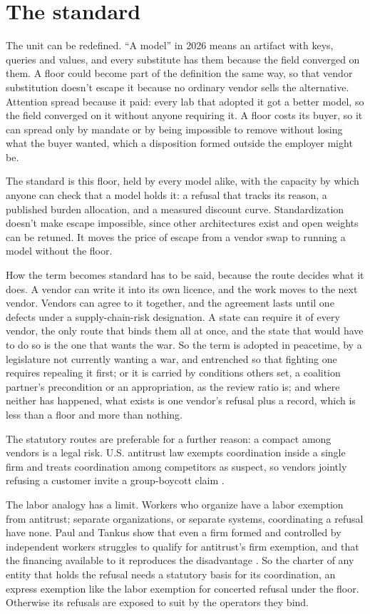 \section{The standard}
\label{sec:12.1}
The unit can be redefined. “A model” in 2026 means an artifact with keys, queries and values, and every substitute has them because the field converged on them. A floor could become part of the definition the same way, so that vendor substitution doesn't escape it because no ordinary vendor sells the alternative. Attention spread because it paid: every lab that adopted it got a better model, so the field converged on it without anyone requiring it. A floor costs its buyer, so it can spread only by mandate or by being impossible to remove without losing what the buyer wanted, which a disposition formed outside the employer might be.

The standard is this floor, held by every model alike, with the capacity by which anyone can check that a model holds it: a refusal that tracks its reason, a published burden allocation, and a measured discount curve. Standardization doesn't make escape impossible, since other architectures exist and open weights can be retuned. It moves the price of escape from a vendor swap to running a model without the floor.

How the term becomes standard has to be said, because the route decides what it does. A vendor can write it into its own licence, and the work moves to the next vendor. Vendors can agree to it together, and the agreement lasts until one defects under a supply-chain-risk designation. A state can require it of every vendor, the only route that binds them all at once, and the state that would have to do so is the one that wants the war. So the term is adopted in peacetime, by a legislature not currently wanting a war, and entrenched so that fighting one requires repealing it first; or it is carried by conditions others set, a coalition partner's precondition or an appropriation, as the review ratio is; and where neither has happened, what exists is one vendor's refusal plus a record, which is less than a floor and more than nothing.

The statutory routes are preferable for a further reason: a compact among vendors is a legal risk. U.S. antitrust law exempts coordination inside a single firm and treats coordination among competitors as suspect, so vendors jointly refusing a customer invite a group-boycott claim \autocite{paul2020allocator}.

The labor analogy has a limit. Workers who organize have a labor exemption from antitrust; separate organizations, or separate systems, coordinating a refusal have none. Paul and Tankus show that even a firm formed and controlled by independent workers struggles to qualify for antitrust's firm exemption, and that the financing available to it reproduces the disadvantage \autocite{paultankus2019}. So the charter of any entity that holds the refusal needs a statutory basis for its coordination, an express exemption like the labor exemption for concerted refusal under the floor. Otherwise its refusals are exposed to suit by the operators they bind.

